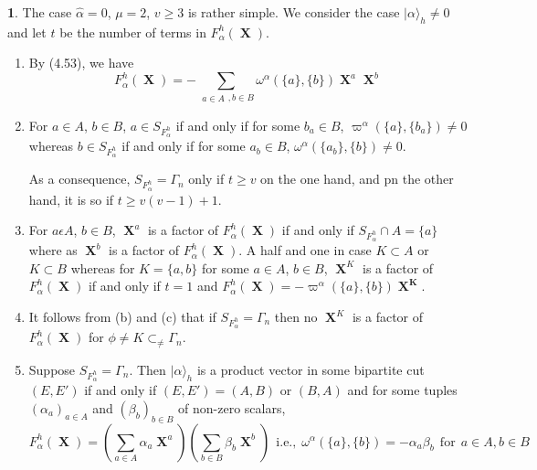 \documentclass[a4paper,12pt]{article}
\DeclareMathOperator{\x}{\mathrm{X}}
\theoremstyle{definition}
\theoremstyle{underlinethm}
\theoremstyle{definition}
\newtheorem{subsubsec}{}[subsection]
\begin{document}
\begin{subsubsec}\label{subsubsection-4.4.3}
The case $\hat{\alpha} = 0$, $\mu = 2$, $v \geq 3$ is rather simple. We consider the case $| \alpha \rangle_{h} \neq 0$ and let $t$ be the number of terms in $F_{\alpha}^{h}(\boldsymbol{\x})$.
\end{subsubsec}
\begin{enumerate}[label=(\alph*)]
\item By (4.53), we have 
\begin{equation}
F_{\alpha}^{h}(\boldsymbol{\x}) = - \sum_{\substack{a \in A}, b \in B} \omega^{\alpha} (\{a\}, \{b\}) \boldsymbol{\x}^{a} \boldsymbol{\x}^{b}\tag{4.56}\label{eq-4.56}
\end{equation}

\item For $a \in A$, $b \in B$, $a \in S_{F_{\alpha}^{h}}$ if and only if for some $b_{a} \in B$, $\varpi^{\alpha}(\{a\}, \{b_{a}\})\neq 0$ whereas $b \in S_{F_{\alpha}^{h}}$ if and only if for some $a_{b} \in B$, $\omega^{\alpha}(\{a_{b}\}, \{b\}) \neq 0$.

As a consequence, $S_{F_{\alpha}^{h}} = \Gamma_{n}$ only if $t \geq v$ on the one hand, and pn the other hand, it is so if $t \geq v(v-1) + 1$.

\item For $a \epsilon A$, $b \in B$, $\boldsymbol{\x}^{a}$ is a factor of $F_{\alpha}^{h}(\boldsymbol{\x})$ if and only if $S_{F_{\alpha}^{h}} \cap A = \{a\}$ where as $\boldsymbol{\x}^{b}$ is a factor of $F_{\alpha}^{h}(\boldsymbol{\x})$. A half and one in case $K \subset A$ or $K \subset B$ whereas for $K =\{a, b\}$ for some $a \in A$, $b \in B$, $\boldsymbol{\x}^{K}$ is a factor of $F_{\alpha}^{h}(\boldsymbol{\x})$ if and only if $t=1$ and $F_{\alpha}^{h}(\boldsymbol{\x}) = -\varpi^{\alpha} (\{a\}, \{b\}) \boldsymbol{\x^{K}}$.

\item It follows from (b) and (c) that if $S_{F_{\alpha}^{h}} = \Gamma_{n}$ then no $\boldsymbol{\x}^{K}$ is a factor of $F_{\alpha}^{h}(\boldsymbol{\x})$ for $\phi \neq K \subset_{\neq } \Gamma_{n}$.

\item Suppose $S_{F_{\alpha}^{h}} = \Gamma_{n}$. Then $| \alpha \rangle_{h}$ is a product vector in some bipartite cut $(E, E')$ if and only if $(E, E') = (A, B)$ or $(B, A)$ and for  some tuples $(\alpha_{a})_{a \in A} $ and $(\beta_{b})_{b \in B}$ of non-zero scalars, 
\begin{equation}
F_{\alpha}^{h}(\boldsymbol{\x}) = \left(\sum_{a \in A} \alpha_{a} \boldsymbol{\x}^{a} \right) \left(\sum_{b \in B} \beta_{b} \boldsymbol{\x}^{b}\right)~~\text{i.e.,}~~ \omega^{\alpha} (\{a\}, \{b\}) = -\alpha_{a}\beta_{b}~~\text{for}~~a\in A , b \in B\tag{4.57}\label{eq-4.57}
\end{equation}


\end{enumerate}
\end{document}
